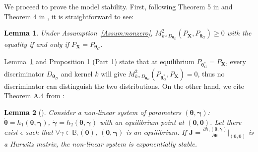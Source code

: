 \documentclass{article} %
\theoremstyle{plain}
\newtheorem*{proposition 1*}{Proposition 1}
\newtheorem{lemma_s}{Lemma}[section]  %
\newcommand{\set}[1]{\mathbb{#1}}  %
\newcommand{\rdv}[1]{\mathbf{#1}}  %
\begin{document}
\begin{appendices}
We proceed to prove the model stability. First, following Theorem 5 in \cite{mmdtest} and Theorem 4 in \cite{mmd_gan_g}, it is straightforward to see:
\begin{lemma_s}\label{lemma:non_negative}
	Under Assumption~\ref{Assum:nonzero}, \(M_{k\circ D_{\bm{\theta}_D}}^2(P_{\rdv{X}},P_{\bm{\theta}_G})\ge0\) with the equality if and only if \(P_{\rdv{X}}=P_{\bm{\theta}_G}\).
\end{lemma_s}
Lemma~\ref{lemma:non_negative} and Proposition 1 (Part 1) state that at equilibrium \(P_{\bm{\theta}_G^*}=P_{\rdv{X}}\), every discriminator \(D_{\bm{\theta}_D}\) and kernel \(k\) will give \(M_{k\circ D_{\bm{\theta}_D}}^2(P_{\bm{\theta}_G^*},P_{\rdv{X}})=0\), thus no discriminator can distinguish the two distributions. On the other hand, we cite Theorem A.4 from \cite{gan_stable}:
\begin{lemma_s}[\cite{gan_stable}]\label{lemma:exp_stable}
	Consider a non-linear system of parameters \((\bm{\theta}, \bm{\gamma})\): \(\dot{\bm{\theta}}=h_1(\bm{\theta}, \bm{\gamma})\), \(\dot{\bm{\gamma}}=h_2(\bm{\theta}, \bm{\gamma})\) with an equilibrium point at \((\bm{0},\bm{0})\). Let there exist \(\epsilon\) such that \(\forall\gamma\in\set{B}_\epsilon(\bm{0})\), \((\bm{0},\bm{\gamma})\) is an equilibrium. If \(\bm{J}=\frac{\partial h_1(\bm{\theta}, \bm{\gamma})}{\partial\bm{\theta}}\big\rvert_{(\bm{0},\bm{0})}\) is a Hurwitz matrix, the non-linear system is exponentially stable.
\end{lemma_s}


\end{appendices}
\end{document}
